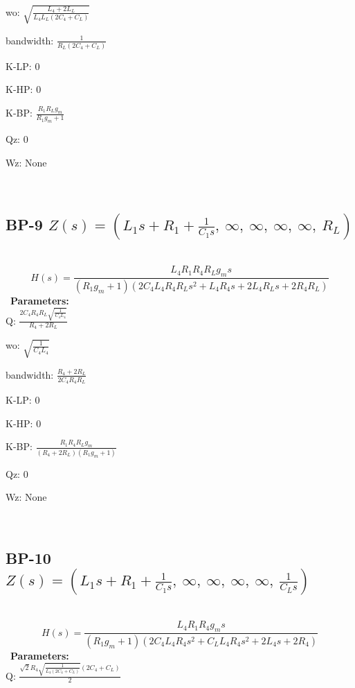 \documentclass{article}
\begin{document}
wo: $\sqrt{\frac{L_{4} + 2 L_{L}}{L_{4} L_{L} \left(2 C_{4} + C_{L}\right)}}$\ 

bandwidth: $\frac{1}{R_{L} \left(2 C_{4} + C_{L}\right)}$\ 

K-LP: $0$\ 

K-HP: $0$\ 

K-BP: $\frac{R_{1} R_{L} g_{m}}{R_{1} g_{m} + 1}$\ 

Qz: $0$\ 

Wz: $\text{None}$\ 

\ 

\subsection{BP-9 $Z(s) = \left( L_{1} s + R_{1} + \frac{1}{C_{1} s}, \  \infty, \  \infty, \  \infty, \  \infty, \  R_{L}\right)$ } \ 
\textbf{\[H(s) = \frac{L_{4} R_{1} R_{4} R_{L} g_{m} s}{\left(R_{1} g_{m} + 1\right) \left(2 C_{4} L_{4} R_{4} R_{L} s^{2} + L_{4} R_{4} s + 2 L_{4} R_{L} s + 2 R_{4} R_{L}\right)}\] } \ 
\textbf{Parameters:}\\ 

Q: $\frac{2 C_{4} R_{4} R_{L} \sqrt{\frac{1}{C_{4} L_{4}}}}{R_{4} + 2 R_{L}}$\ 

wo: $\sqrt{\frac{1}{C_{4} L_{4}}}$\ 

bandwidth: $\frac{R_{4} + 2 R_{L}}{2 C_{4} R_{4} R_{L}}$\ 

K-LP: $0$\ 

K-HP: $0$\ 

K-BP: $\frac{R_{1} R_{4} R_{L} g_{m}}{\left(R_{4} + 2 R_{L}\right) \left(R_{1} g_{m} + 1\right)}$\ 

Qz: $0$\ 

Wz: $\text{None}$\ 

\ 

\subsection{BP-10 $Z(s) = \left( L_{1} s + R_{1} + \frac{1}{C_{1} s}, \  \infty, \  \infty, \  \infty, \  \infty, \  \frac{1}{C_{L} s}\right)$ } \ 
\textbf{\[H(s) = \frac{L_{4} R_{1} R_{4} g_{m} s}{\left(R_{1} g_{m} + 1\right) \left(2 C_{4} L_{4} R_{4} s^{2} + C_{L} L_{4} R_{4} s^{2} + 2 L_{4} s + 2 R_{4}\right)}\] } \ 
\textbf{Parameters:}\\ 

Q: $\frac{\sqrt{2} R_{4} \sqrt{\frac{1}{L_{4} \left(2 C_{4} + C_{L}\right)}} \left(2 C_{4} + C_{L}\right)}{2}$\ 
\end{document}
